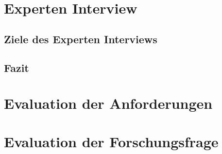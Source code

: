 \section{Experten Interview}
    \subsection{Ziele des Experten Interviews}
    \subsection{Fazit}

\section{Evaluation der Anforderungen}

\section{Evaluation der Forschungsfrage}